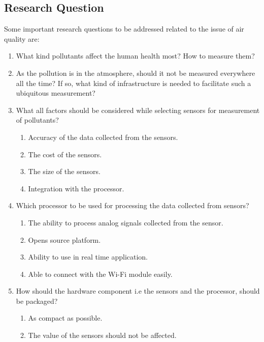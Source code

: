 \documentclass[11pt]{article}
\begin{document}
 \subsection{Research Question}
 
 Some important research questions to be addressed related to the issue of air quality are: 

 \begin{enumerate}
  \item What kind pollutants affect the human health most? How to measure them?
   
  \item  As the pollution is in the atmosphere, should it not be measured everywhere all the time? If so, what kind of infrastructure is needed to facilitate such a ubiquitous measurement?
  
 \item What all factors should be considered while selecting sensors for measurement of pollutants?
 
 \begin{enumerate}
 \item Accuracy of the data collected from the sensors.
 \item The cost of the sensors.
 \item The size of the sensors.
 \item Integration with the processor.
 \end{enumerate}

 \item Which processor to be used for processing the data collected from sensors?
 
 \begin{enumerate}
 \item The ability to process analog signals collected from the sensor.
 \item Opens source platform.
 \item Ability to use in real time application.
 \item Able to connect with the Wi-Fi module easily.
 \end{enumerate}

 \item How should the hardware component i.e the sensors and the processor, should be packaged?
 
 \begin{enumerate}
\item As compact as possible.
\item The value of the sensors should not be affected.  
 \end{enumerate}
 

\end{enumerate}
\end{document}
